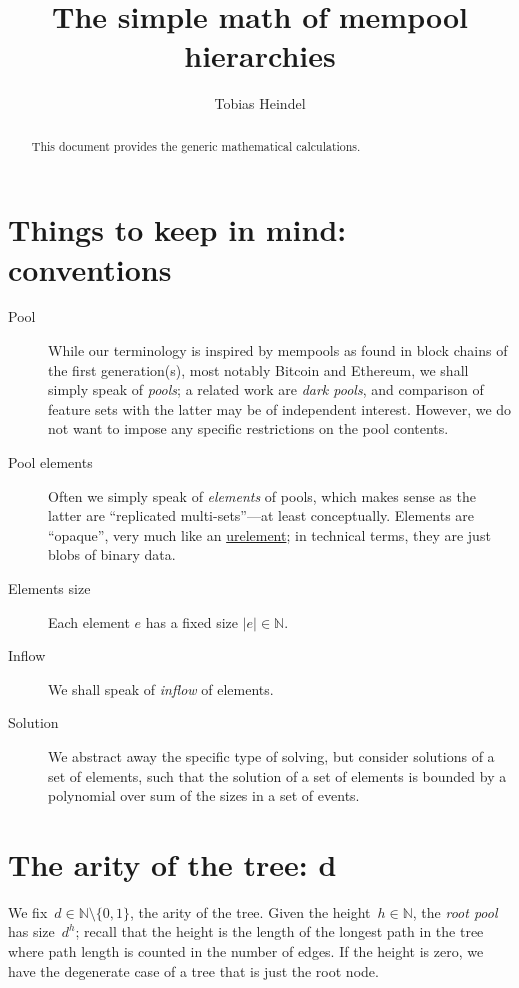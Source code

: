 \documentclass{article}
\title{The simple math of mempool hierarchies}
\author{Tobias Heindel}
\begin{document}
\maketitle
\begin{abstract}
  This document provides the generic mathematical calculations.
\end{abstract}

\section{Things to keep in mind: conventions}
\label{sec:conventions}

\begin{description}
\item[Pool]
  While our terminology is inspired by mempools
  as found in block chains of the first generation(s),
  most notably Bitcoin and Ethereum,
  we shall simply speak of \emph{pools};
  a related work are \emph{dark pools},
  and comparison of feature sets with the latter may be of independent interest.
  However,
  we do not want to impose any specific restrictions on the
  pool contents.
\item[Pool elements]
  Often we simply speak of \emph{elements} of pools,
  which makes sense as the latter are ``replicated multi-sets''—at
  least conceptually.
  Elements are ``opaque'',
  very much like an \href{https://en.wikipedia.org/wiki/Urelement}{urelement};
  in technical terms,
  they are just blobs of binary data.
\item[Elements size]
  Each element $e$ has a fixed size $|e|∈ℕ$.
\item[Inflow]
  We shall speak of \emph{inflow} of elements.
\item[Solution]
  We abstract away the specific type of solving,
  but consider solutions of a set of elements,
  such that the solution of a set of elements is bounded by
  a polynomial over sum of the sizes in a set of events.
\end{description}

\section{The arity of the tree: $\boldsymbol d$}%
\label{sec:tree-arity}

We fix~$d ∈ ℕ \setminus \{ 0, 1 \}$,
the arity of the tree.
Given the height~$h\in ℕ$, 
the \emph{root pool} has size~$d^h$;
recall that the height is the length of the longest path in the tree
where path length is counted in the number of edges.
If the height is zero,
we have the degenerate case of
a tree that is just the root node.
\end{document}
